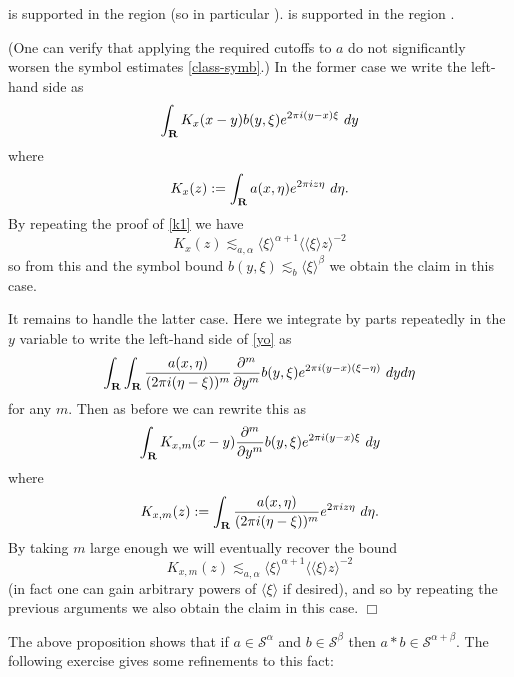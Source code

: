\documentclass[11pt]{article}
\theoremstyle{definition}
\theoremstyle{remark}
\begin{document}
  is supported in the region  (so in particular ). 
  is supported in the region .


 (One can verify that applying the required cutoffs to \({a}\) do not significantly worsen the symbol estimates \eqref{class-symb}.) In the former case we write the left-hand side as 
\[\displaystyle  \int_{\bf R} K_x(x-y) b(y,\xi) e^{2\pi i (y-x)\xi}\ dy\]
 where 
\[\displaystyle  K_x(z) := \int_{\bf R} a(x,\eta) e^{2\pi i z \eta}\ d\eta.\]
 By repeating the proof of \eqref{k1} we have 
\[\displaystyle  K_x(z) \lesssim_{a,\alpha} \langle \xi \rangle^{\alpha+1} \langle \langle \xi \rangle z \rangle^{-2}\]
 so from this and the symbol bound \({b(y,\xi) \lesssim_b \langle \xi\rangle^\beta}\) we obtain the claim in this case.

It remains to handle the latter case. Here we integrate by parts repeatedly in the \({y}\) variable to write the left-hand side of \eqref{yo} as 
\[\displaystyle  \int_{\bf R} \int_{\bf R} \frac{a(x,\eta)}{(2\pi i(\eta-\xi))^m} \frac{\partial^m}{\partial y^m} b(y,\xi) e^{2\pi i (y-x)(\xi-\eta)}\ dy d\eta\]
 for any \({m}\). Then as before we can rewrite this as 
\[\displaystyle  \int_{\bf R} K_{x,m}(x-y) \frac{\partial^m}{\partial y^m} b(y,\xi) e^{2\pi i (y-x)\xi}\ dy\]
 where 
\[\displaystyle  K_{x,m}(z) := \int_{\bf R} \frac{a(x,\eta)}{(2\pi i(\eta-\xi))^m} e^{2\pi i z \eta}\ d\eta.\]
 By taking \({m}\) large enough we will eventually recover the bound 
\[\displaystyle  K_{x,m}(z) \lesssim_{a,\alpha} \langle \xi \rangle^{\alpha+1} \langle \langle \xi \rangle z \rangle^{-2}\]
 (in fact one can gain arbitrary powers of \({\langle \xi \rangle}\) if desired), and so by repeating the previous arguments we also obtain the claim in this case. \(\Box\)

The above proposition shows that if \({a \in {\mathcal S}^\alpha}\) and \({b \in {\mathcal S}^\beta}\) then \({a \ast b \in {\mathcal S}^{\alpha+\beta}}\). The following exercise gives some refinements to this fact:
\end{document}
